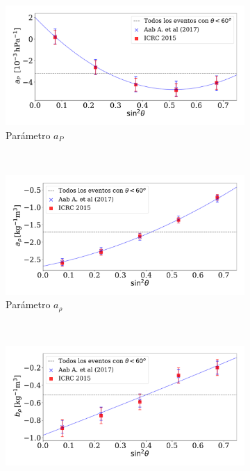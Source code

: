                 \begin{figure}[H]
                    \centering
                    \begin{subfigure}[b]{0.75\textwidth}
                    \includegraphics[width=\linewidth]{Graphs/params/ap_ICRC_2015_above_1EeV_v2.pdf}
                    \caption{Parámetro $a_P$ }
                    \label{fig:ap_2015}
                    \end{subfigure}\\
                    \begin{subfigure}[b]{0.75\textwidth}
                    \includegraphics[width=\linewidth]{Graphs/params/arho_ICRC_2015_above_1EeV_v2.pdf}
                    \caption{Parámetro $a_{\rho}$ }
                    \label{fig:arho_2015}
                    \end{subfigure}\\
                    \begin{subfigure}[b]{\textwidth}
                    \centering
                    \includegraphics[width=0.75\linewidth]{Graphs/params/brho_ICRC_2015_above_1EeV_v2.pdf}

\end{subfigure}
\end{figure}
